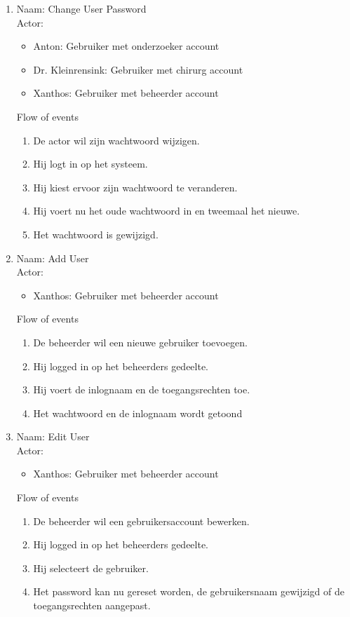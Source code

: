 \begin{enumerate}
\item   Naam: Change User Password \\
	Actor:
	\begin{itemize}
		\item Anton: Gebruiker met onderzoeker account
		\item Dr. Kleinrensink: Gebruiker met chirurg account
		\item Xanthos: Gebruiker met beheerder account
	\end{itemize}
	Flow of events
	\begin{enumerate}
		\item De actor wil zijn wachtwoord wijzigen.
		\item Hij logt in op het systeem.
		\item Hij kiest ervoor zijn wachtwoord te veranderen.
		\item Hij voert nu het oude wachtwoord in en tweemaal het nieuwe.
		\item Het wachtwoord is gewijzigd.
	\end{enumerate}

\item   Naam: Add User  \\
	Actor:
	\begin{itemize}
		\item Xanthos: Gebruiker met beheerder account
	\end{itemize}
	Flow of events
	\begin{enumerate}
	  \item De beheerder wil een nieuwe gebruiker toevoegen.
		\item Hij logged in op het beheerders gedeelte.
		\item Hij voert de inlognaam en de toegangsrechten toe.
		\item Het wachtwoord en de inlognaam wordt getoond
	\end{enumerate}
	


\item   Naam: Edit User  \\
	Actor:
	\begin{itemize}
		\item Xanthos: Gebruiker met beheerder account
	\end{itemize}
	Flow of events
	\begin{enumerate}
	  \item De beheerder wil een gebruikersaccount bewerken.
		\item Hij logged in op het beheerders gedeelte.
		\item Hij selecteert de gebruiker.
		\item Het password kan nu gereset worden, de gebruikersnaam gewijzigd of de toegangsrechten aangepast.
	\end{enumerate}




\end{enumerate}
